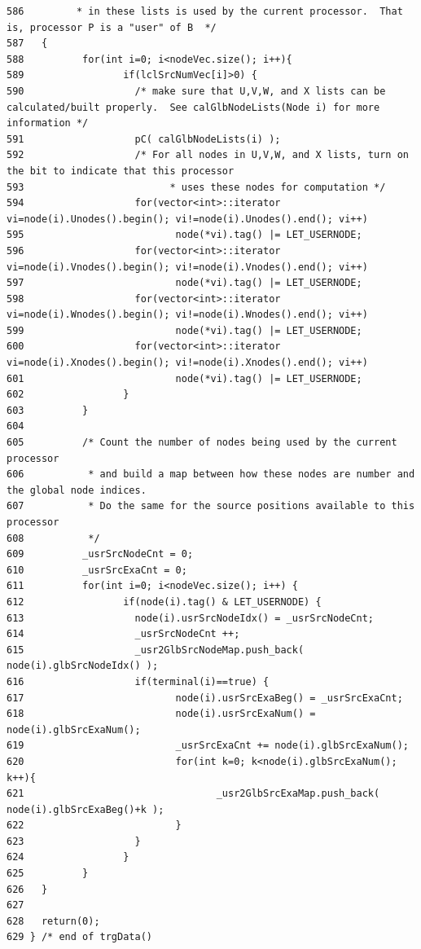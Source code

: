 \begin{verbatim}
586         * in these lists is used by the current processor.  That is, processor P is a "user" of B  */
587   {
588          for(int i=0; i<nodeVec.size(); i++){
589                 if(lclSrcNumVec[i]>0) {
590                   /* make sure that U,V,W, and X lists can be calculated/built properly.  See calGlbNodeLists(Node i) for more information */
591                   pC( calGlbNodeLists(i) );
592                   /* For all nodes in U,V,W, and X lists, turn on the bit to indicate that this processor
593                         * uses these nodes for computation */
594                   for(vector<int>::iterator vi=node(i).Unodes().begin(); vi!=node(i).Unodes().end(); vi++)
595                          node(*vi).tag() |= LET_USERNODE;
596                   for(vector<int>::iterator vi=node(i).Vnodes().begin(); vi!=node(i).Vnodes().end(); vi++)
597                          node(*vi).tag() |= LET_USERNODE;
598                   for(vector<int>::iterator vi=node(i).Wnodes().begin(); vi!=node(i).Wnodes().end(); vi++)
599                          node(*vi).tag() |= LET_USERNODE;
600                   for(vector<int>::iterator vi=node(i).Xnodes().begin(); vi!=node(i).Xnodes().end(); vi++)
601                          node(*vi).tag() |= LET_USERNODE;
602                 }
603          }
604 
605          /* Count the number of nodes being used by the current processor
606           * and build a map between how these nodes are number and the global node indices.
607           * Do the same for the source positions available to this processor
608           */
609          _usrSrcNodeCnt = 0;
610          _usrSrcExaCnt = 0;
611          for(int i=0; i<nodeVec.size(); i++) {
612                 if(node(i).tag() & LET_USERNODE) {
613                   node(i).usrSrcNodeIdx() = _usrSrcNodeCnt;
614                   _usrSrcNodeCnt ++;
615                   _usr2GlbSrcNodeMap.push_back( node(i).glbSrcNodeIdx() );
616                   if(terminal(i)==true) {
617                          node(i).usrSrcExaBeg() = _usrSrcExaCnt;
618                          node(i).usrSrcExaNum() = node(i).glbSrcExaNum();
619                          _usrSrcExaCnt += node(i).glbSrcExaNum();
620                          for(int k=0; k<node(i).glbSrcExaNum(); k++){
621                                 _usr2GlbSrcExaMap.push_back( node(i).glbSrcExaBeg()+k );
622                          }
623                   }
624                 }
625          }
626   } 
627   
628   return(0);
629 } /* end of trgData()
\end{verbatim}\normalsize 


